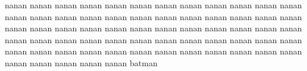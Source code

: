 \documentclass[11pt,a4paper]{report}
\begin{document}
\begin{multicols}{2}
nanan nanan nanan nanan nanan nanan nanan nanan nanan nanan nanan nanan nanan
nanan nanan nanan nanan nanan nanan nanan nanan nanan nanan nanan nanan nanan
nanan nanan nanan nanan nanan nanan nanan nanan nanan nanan nanan nanan nanan
nanan nanan nanan nanan nanan nanan nanan nanan nanan nanan nanan nanan nanan
nanan nanan nanan nanan nanan nanan nanan nanan nanan nanan nanan nanan nanan
batman

%
%
%
%
%
%


%









\end{multicols}
\end{document}
